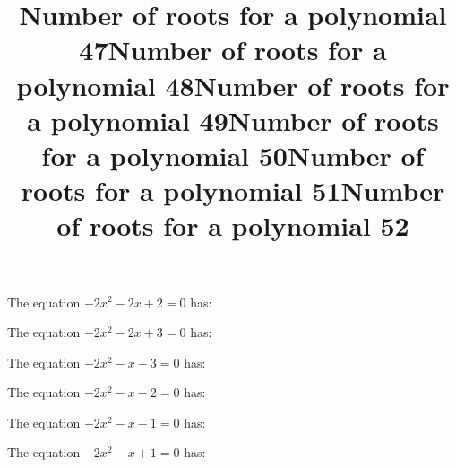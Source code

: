 \documentclass{article}
\begin{document}
\begin{category}
\begin{question}[multichoice]


\end{question}
\begin{question}[multichoice]
\title{Number of roots for a polynomial 47}
The equation $- 2 x^{2} - 2 x + 2=0$ has:



\end{question}
\begin{question}[multichoice]
\title{Number of roots for a polynomial 48}
The equation $- 2 x^{2} - 2 x + 3=0$ has:



\end{question}
\begin{question}[multichoice]
\title{Number of roots for a polynomial 49}
The equation $- 2 x^{2} - x - 3=0$ has:



\end{question}
\begin{question}[multichoice]
\title{Number of roots for a polynomial 50}
The equation $- 2 x^{2} - x - 2=0$ has:



\end{question}
\begin{question}[multichoice]
\title{Number of roots for a polynomial 51}
The equation $- 2 x^{2} - x - 1=0$ has:



\end{question}
\begin{question}[multichoice]
\title{Number of roots for a polynomial 52}
The equation $- 2 x^{2} - x + 1=0$ has:




\end{question}
\end{category}
\end{document}
